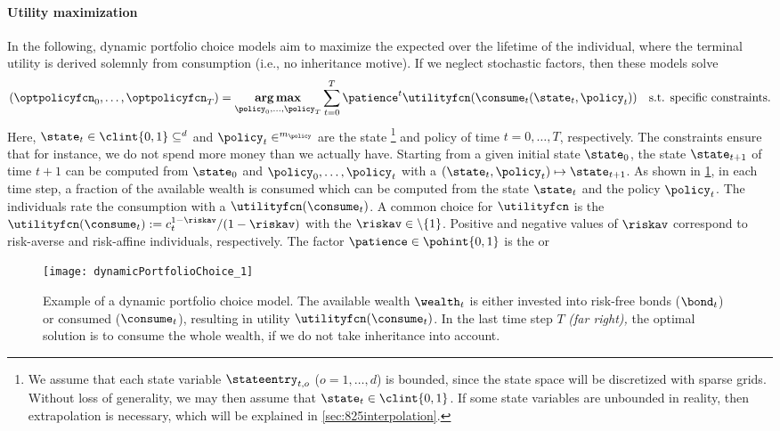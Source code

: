 \paragraph{Utility maximization}

In the following, dynamic portfolio choice models aim to maximize the expected
 over the lifetime of the individual,
where the terminal utility is derived solemnly from consumption
(i.e., no inheritance motive).
If we neglect stochastic factors, then these models solve
\begin{equation}
  \label{eq:utilityMaximization}
  (\optpolicyfcn_0, \dotsc, \optpolicyfcn_T)
  = \vecargmax_{\policy_0, \dotsc, \policy_T}
  \sum_{t=0}^T \patience^t \utilityfcn(\consume_t(\state_t, \policy_t))
  \quad\text{s.t. specific constraints.}
\end{equation}
Here, $\state_t \in \clint{\*0, \*1} \subset \real^d$ and
$\policy_t \in \real^{m_{\policy}}$
are the state%
\footnote{%
  We assume that each state variable $\stateentry_{t,o}$ ($o = 1, \dotsc, d$)
  is bounded, since the state space will be discretized with sparse grids.
  Without loss of generality, we may then assume that
  $\state_t \in \clint{\*0, \*1}$.
  If some state variables are unbounded in reality,
  then extrapolation is necessary,
  which will be explained in \cref{sec:825interpolation}.%
}
and policy of time $t = 0, \dotsc, T$, respectively.
The constraints ensure that for instance, we do not spend more money
than we actually have.
Starting from a given initial state $\state_0$,
the state $\state_{t+1}$ of time $t+1$ can be computed from
$\state_0$ and $\policy_0, \dotsc, \policy_t$ with a
 $(\state_t, \policy_t) \mapsto \state_{t+1}$.
As shown in \cref{fig:dynamicPortfolioChoice},
in each time step, a fraction of the available wealth is consumed
which can be computed from the state $\state_t$ and the policy $\policy_t$.
The individuals rate the consumption with a 
$\utilityfcn(\consume_t)$.
A common choice for $\utilityfcn$ is the 
$\utilityfcn(\consume_t) := c_t^{1-\riskav}/(1-\riskav)$
with the  $\riskav \in \real \setminus \{1\}$.
Positive and negative values of $\riskav$
correspond to risk-averse and risk-affine individuals, respectively.
The factor $\patience \in \pohint{0, 1}$ is the 
or 

\begin{SCfigure}
  \texttt{[image: dynamicPortfolioChoice\_1]}%
  \caption[Example of a dynamic portfolio choice model]{%
    Example of a dynamic portfolio choice model.
    The available wealth $\wealth_t$ is either
    invested into risk-free bonds ($\bond_t$) or consumed ($\consume_t$),
    resulting in utility $\utilityfcn(\consume_t)$.
    In the last time step $T$ \emph{(far right),}
    the optimal solution is to consume the whole wealth,
    if we do not take inheritance into account.%
  }%
  \label{fig:dynamicPortfolioChoice}%
\end{SCfigure}

